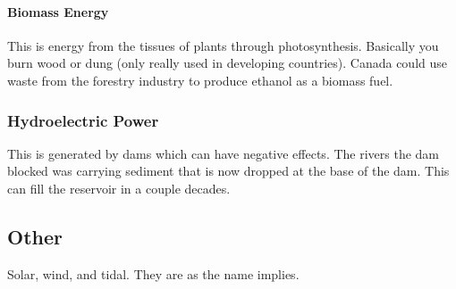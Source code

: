 \documentclass{article}
\begin{document}
\paragraph{Biomass Energy} %
\label{par:biomass_energy}
This is energy from the tissues of plants through photosynthesis. Basically you burn wood or dung (only really used in developing countries). Canada could use waste from the forestry industry to produce ethanol as a biomass fuel.

\subsubsection{Hydroelectric Power} %
\label{sub:hydroelectric_power}
This is generated by dams which can have negative effects. The rivers the dam blocked was carrying sediment that is now dropped at the base of the dam. This can fill the reservoir in a couple decades.

\subsection{Other} %
\label{sub:other}
Solar, wind, and tidal. They are as the name implies.


\end{document}
